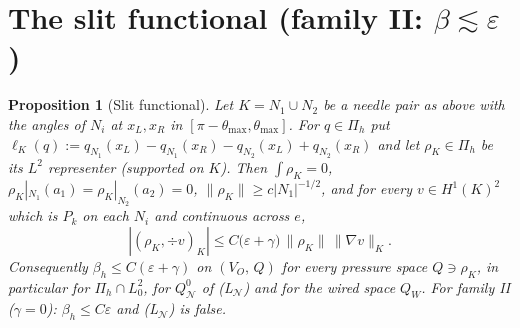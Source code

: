 \documentclass[11pt]{article}
\newtheorem{proposition}[theorem]{Proposition}
\theoremstyle{remark}
\newcommand{\VO}{V_O}
\newcommand{\Pih}{\Pi_h}
\newcommand{\norm}[1]{\|#1\|}
\newcommand{\Nset}{\mathcal N}
\begin{document}
\section{The slit functional (family II: $\beta\lesssim\varepsilon$)}\label{sec:B}
\begin{proposition}[Slit functional]\label{prop:B}
Let $K=N_1\cup N_2$ be a needle pair as above with the angles of $N_i$ at $x_L,x_R$ in $[\pi-\theta_{\max},\theta_{\max}]$. For
$q\in\Pih$ put $\ell_K(q):=q_{N_1}(x_L)-q_{N_1}(x_R)-q_{N_2}(x_L)+q_{N_2}(x_R)$ and let $\rho_K\in\Pih$ be its $L^2$ representer
(supported on $K$). Then $\int\rho_K=0$, $\rho_K|_{N_1}(a_1)=\rho_K|_{N_2}(a_2)=0$, $\norm{\rho_K}\ge c|N_1|^{-1/2}$, and for every
$v\in H^1(K)^2$ which is $P_k$ on each $N_i$ and continuous across $e$,
\[
|(\rho_K,\div v)_K|\le C\big(\varepsilon+\gamma\big)\,\norm{\rho_K}\,\norm{\nabla v}_K .
\]
Consequently $\beta_h\le C(\varepsilon+\gamma)$ on $(\VO,\,Q)$ for \emph{every} pressure space $Q\ni\rho_K$, in particular for
$\Pih\cap L^2_0$, for $Q^0_\Nset$ of (L$_\Nset$) and for the wired space $Q_W$. For family II ($\gamma=0$): $\beta_h\le C\varepsilon$ and
(L$_\Nset$) is false.
\end{proposition}
\end{document}
